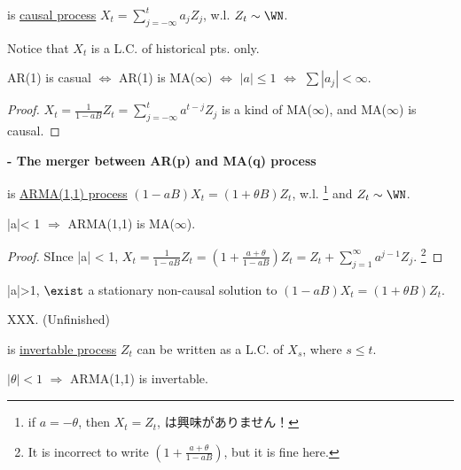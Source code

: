 \begin{definition}
 is \uline{causal process} \iff $X_t = \sum_{j = -\infty}^{t} a_j Z_j$, w.l. $Z_t \sim \WN$.

Notice that $X_t$ is a L.C. of historical pts. only.
\end{definition}

\begin{lemma}
AR(1) is casual $\Leftrightarrow$ AR(1) is MA($\infty$) $\Leftrightarrow$ $|a| \leq 1$ $\Leftrightarrow$ $\sum |a_j| < \infty$.
\end{lemma}

\begin{proof}
$X_t = \frac{1}{1-a B} Z_t = \sum_{j = -\infty}^{t} a^{t-j} Z_j$ is a kind of MA($\infty$), and MA($\infty$) is causal. 
\end{proof}

\vspace{1em}

\noindent \textbf{- The merger between AR(p) and MA(q) process}

\begin{definition}
 is \uline{ARMA(1,1) process} \iff $(1-a B)X_t = (1 + \theta B) Z_t$, w.l. 
\footnote{if $a=-\theta$, then $X_t = Z_t$, \WN は興味がありません！}
and $Z_t \sim \WN$.
\end{definition}

\begin{property}
\item |a|< 1 $\Rightarrow$ ARMA(1,1) is MA($\infty$).

\begin{proof}
SInce |a| < 1, $X_t = \frac{1}{1-a B}Z_t = (1+ \frac{a + \theta}{1-a B})Z_t = Z_t + \sum_{j = 1}^{\infty} a^{j-1}Z_j.$
\footnote{It is incorrect to write $(1+ \frac{a + \theta}{1-a B})$, but it is fine here.}
\end{proof}
\item |a|>1, $\exist$ a stationary non-causal solution to $(1-a B)X_t = (1+\theta B) Z_t$.

XXX. (Unfinished)
\end{property}

\begin{definition}
 is \uline{invertable process} \iff $Z_t$ can be written as a L.C. of $X_s$, where $s\leq t$.
\end{definition}

\begin{lemma}
$|\theta| < 1$ $\Rightarrow$ ARMA(1,1) is invertable.
\end{lemma}

